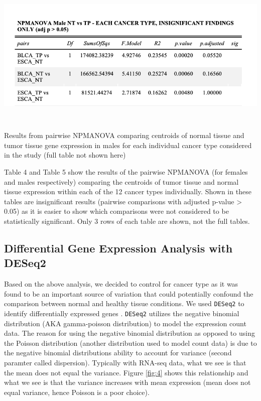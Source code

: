 \documentclass[10pt]{article}
\providecommand{\figref}[1]{Figure \ref{#1}}  %
\begin{document}
	\begin{table}[!h]
		\centering
		\vspace{-0.4cm}\includegraphics[width=18cm, height=7cm]{eachmale_npmanova.png}
		\caption{Results from pairwise NPMANOVA comparing centroids of normal tissue and tumor tissue gene expression in males for each individual cancer type considered in the study (full table not shown here)}
		\label{table:5}
	\end{table}

	Table 4 and Table 5 show the results of the pairwise NPMANOVA (for females and males respectively) comparing the centroids of tumor tissue and normal tissue expression within each of the 12 cancer types individually. Shown in these tables are insignificant results (pairwise comparisons with adjusted p-value > 0.05) as it is easier to show which comparisons were not considered to be statistically significant. Only 3 rows of each table are shown, not the full tables.

	\subsection{Differential Gene Expression Analysis with DESeq2}
	
	Based on the above analysis, we decided to control for cancer type as it was found to be an important source of variation that could potentially confound the comparison between normal and healthy tissue conditions. We used \texttt{DESeq2} to identify differentially expressed genes \citep{love2014moderated}. \texttt{DESeq2} utilizes the negative binomial distribution (AKA gamma-poisson distribution) to model the expression count data. The reason for using the negative binomial distribution as opposed to using the Poisson distribution (another distribution used to model count data) is due to the negative binomial distributions ability to account for variance (second paramter called dispersion). Typically with RNA-seq data, what we see is that the mean does not equal the variance. \figref{fig:4} shows this relationship and what we see is that the variance increases with mean expression (mean does not equal variance, hence Poisson is a poor choice). 
	
\end{document}
